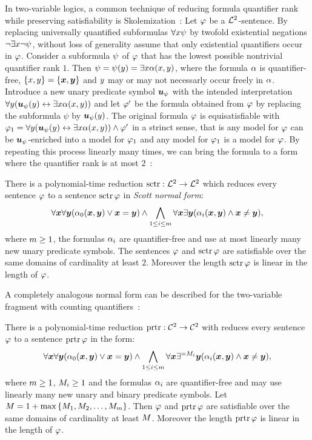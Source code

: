 In two-variable logics, a common technique of reducing formula quantifier rank
while preserving satisfiability is Skolemization~\cite{gradel1999logics}:
Let $\varphi$ be a $\mathcal{L}^{2}$-sentence.
By replacing universally quantified subformulas $\forall x \psi$ by twofold
existential negations $\lnot\exists x \lnot\psi$, without loss of generality
assume that only existential quantifiers occur in $\varphi$.
Consider a subformula $\psi$ of $\varphi$ that has the lowest possible nontrivial
quantifier rank $1$.
Then $\psi = \psi(y) = \exists x \alpha(x,y)$, where the formula
$\alpha$ is quantifier-free, $\left\{x,y\right\} = \left\{\bm{x},\bm{y}\right\}$ and $y$ may
or may not necessarly occur freely in $\alpha$.
Introduce a new unary predicate symbol $\bm{u}_{\psi}$ with the intended
interpretation $\forall y(\bm{u}_{\psi}(y) \leftrightarrow \exists x \alpha(x,y))$ and
let ${\varphi'}$ be the formula obtained from $\varphi$ by replacing the subformula
$\psi$ by $\bm{u}_{\psi}(y)$.
The original formula $\varphi$ is equisatisfiable with
$\varphi_1 = \forall y(\bm{u}_{\psi}(y) \leftrightarrow \exists x \alpha(x,y)) \land
{\varphi'}$ in a strinct sense, that is any model for $\varphi$ can be
$\bm{u}_{\psi}$-enriched into a model for $\varphi_1$ and any model for $\varphi_1$ is a
model for $\varphi$.
By repeating this process linearly many times, we can bring the formula to a
form where the quantifier rank is at most 
$2$~\cite{scott1962decision,gradel1999logics}:
\begin{theorem}[Scott]
There is a polynomial-time reduction $\operatorname{sctr}: \mathcal{L}^{2} \to \mathcal{L}^{2}$ which reduces
every sentence $\varphi$ to a sentence $\operatorname{sctr}\varphi$ in \emph{Scott normal form}:
\[
  \forall\bm{x}\forall\bm{y}(\alpha_{0}(\bm{x},\bm{y}) \lor \bm{x} = \bm{y}) \land
  \bigwedge_{1 \leq i \leq m} \forall\bm{x}\exists\bm{y}
  (\alpha_{i}(\bm{x},\bm{y}) \land \bm{x} \neq \bm{y}),
\]
where $m\geq1$, the formulas $\alpha_{i}$ are quantifier-free and use at most
linearly many new unary predicate symbols. The sentences $\varphi$ and $\operatorname{sctr}\varphi$ are
satisfiable over the same domains of cardinality at least $2$.
Moreover the length $\operatorname{sctr}\varphi$ is linear in the length of $\varphi$.
\end{theorem}

A completely analogous normal form can be described for the two-variable
fragment with counting quantifiers~\cite{MALQ:MALQ201400102}:
\begin{theorem}
There is a polynomial-time reduction $\operatorname{prtr}: \mathcal{C}^{2} \to \mathcal{C}^{2}$ with reduces
every sentence $\varphi$ to a sentence $\operatorname{prtr}\varphi$ in the form:
\[
  \forall\bm{x}\forall\bm{y}(\alpha_{0}(\bm{x},\bm{y}) \lor \bm{x}=\bm{y}) \land
  \bigwedge_{1 \leq i \leq m} \forall\bm{x}\exists^{=M_{i}}\bm{y}
  (\alpha_{i}(\bm{x},\bm{y}) \land \bm{x}\neq\bm{y}),
\]
where $m\geq1$, $M_{i}\geq1$ and the formulas $\alpha_{i}$ are
quantifier-free and may use linearly many new unary and binary predicate symbols. Let $M =
1+\max\left\{M_{1},M_{2},\dots,M_{m}\right\}$.
Then $\varphi$ and $\operatorname{prtr}\varphi$ are satisfiable over the same domains of
cardinality at least $M$.
Moreover the length $\operatorname{prtr}\varphi$ is linear in the length of $\varphi$.
\end{theorem}

